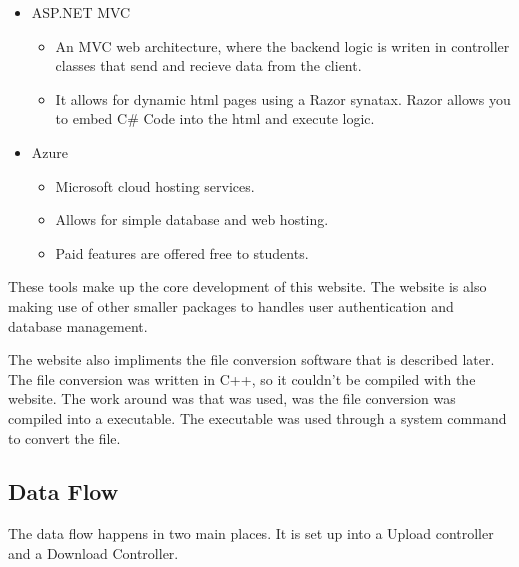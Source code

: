     \begin{itemize}
    \item ASP.NET MVC
    \begin{itemize}
        \item An MVC web architecture, where the backend logic is writen in controller classes
        that send and recieve data from the client.
        \item It allows for dynamic html pages using a Razor synatax. Razor allows
        you to embed C\# Code into the html and execute logic.
    \end{itemize}
    
    \item Azure
        \begin{itemize}
            \item Microsoft cloud hosting services.
            \item Allows for simple database and web hosting.
            \item Paid features are offered free to students.
        \end{itemize}
    \end{itemize}

    These tools make up the core development of this website. The website is also
    making use of other smaller packages to handles user authentication and database management.

    The website also impliments the file conversion software that is described later.
    The file conversion was written in C++, so it couldn't be compiled with the website.
    The work around was that was used, was the file conversion was compiled into a executable.
    The executable was used through a system command to convert the file.


    \subsection{Data Flow}
    The data flow happens in two main places. It is set up into a Upload controller
    and a Download Controller.

